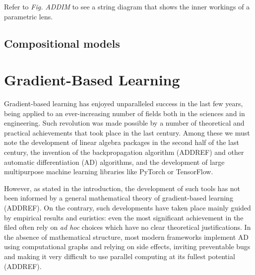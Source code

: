 \documentclass[12pt,a4paper,openright,twoside]{report}
\theoremstyle{plain}
\theoremstyle{definition}
\begin{document}
Refer to \textit{Fig. ADDIM} to see a string diagram that shows the inner workings of a parametric lens.




\section{Compositional models}




















































\chapter{Gradient-Based Learning}
\lhead[\fancyplain{}{\bfseries\thepage}]{\fancyplain{}{\bfseries\rightmark}}





Gradient-based learning has enjoyed unparalleled success in the last few years, being applied to an ever-increasing number of fields both in the sciences and in engineering. Such revolution was made possible by a number of theoretical and practical achievements that took place in the last century. Among these we must note the development of linear algebra packages in the second half of the last century, the invention of the backpropagation algorithm (ADDREF) and other automatic differentiation (AD) algorithms, and the development of large multipurpose machine learning libraries like PyTorch or TensorFlow.


However, as stated in the introduction, the development of such tools has not been informed by a general mathematical theory of gradient-based learning (ADDREF). On the contrary, such developments have taken place mainly guided by empirical results and euristics: even the most significant achievement in the filed often rely on \textit{ad hoc} choices which have no clear theoretical justifications. In the absence of mathematical structure, most modern frameworks implement AD using computational graphs and relying on side effects, inviting preventable bugs and making it very difficult to use parallel computing at its fullest potential (ADDREF).
\end{document}
